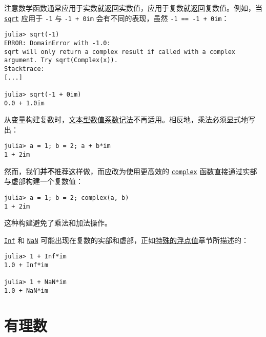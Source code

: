 注意数学函数通常应用于实数就返回实数值，应用于复数就返回复数值。例如，当 \hyperlink{4551113327515323898}{\texttt{sqrt}} 应用于 \texttt{-1} 与 \texttt{-1 + 0im} 会有不同的表现，虽然 \texttt{-1 == -1 + 0im}：




\begin{verbatim}
julia> sqrt(-1)
ERROR: DomainError with -1.0:
sqrt will only return a complex result if called with a complex argument. Try sqrt(Complex(x)).
Stacktrace:
[...]

julia> sqrt(-1 + 0im)
0.0 + 1.0im
\end{verbatim}



从变量构建复数时，\hyperlink{7285052708387693199}{文本型数值系数记法}不再适用。相反地，乘法必须显式地写出：




\begin{verbatim}
julia> a = 1; b = 2; a + b*im
1 + 2im
\end{verbatim}



然而，我们\textbf{并不}推荐这样做，而应改为使用更高效的 \hyperlink{16014240202095271744}{\texttt{complex}} 函数直接通过实部与虚部构建一个复数值：




\begin{verbatim}
julia> a = 1; b = 2; complex(a, b)
1 + 2im
\end{verbatim}



这种构建避免了乘法和加法操作。



\hyperlink{1907914141659611007}{\texttt{Inf}} 和 \hyperlink{11449618129446476597}{\texttt{NaN}} 可能出现在复数的实部和虚部，正如\hyperlink{17731750208832839264}{特殊的浮点值}章节所描述的：




\begin{verbatim}
julia> 1 + Inf*im
1.0 + Inf*im

julia> 1 + NaN*im
1.0 + NaN*im
\end{verbatim}



\hypertarget{8440700082217486421}{}


\section{有理数}




